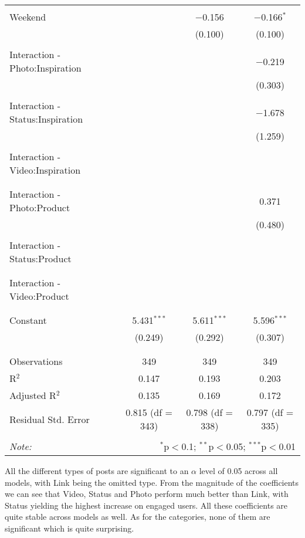 \documentclass[
]{article}
\begin{document}
\begin{longtable}{@{\extracolsep{5pt}}lccc}
  & & & \\ 
 Weekend &  & $-$0.156 & $-$0.166$^{*}$ \\ 
  &  & (0.100) & (0.100) \\ 
  & & & \\ 
 Interaction - Photo:Inspiration &  &  & $-$0.219 \\ 
  &  &  & (0.303) \\ 
  & & & \\ 
 Interaction - Status:Inspiration &  &  & $-$1.678 \\ 
  &  &  & (1.259) \\ 
  & & & \\ 
 Interaction - Video:Inspiration &  &  &  \\ 
  &  &  &  \\ 
  & & & \\ 
 Interaction - Photo:Product &  &  & 0.371 \\ 
  &  &  & (0.480) \\ 
  & & & \\ 
 Interaction - Status:Product &  &  &  \\ 
  &  &  &  \\ 
  & & & \\ 
 Interaction - Video:Product &  &  &  \\ 
  &  &  &  \\ 
  & & & \\ 
 Constant & 5.431$^{***}$ & 5.611$^{***}$ & 5.596$^{***}$ \\ 
  & (0.249) & (0.292) & (0.307) \\ 
  & & & \\ 
\hline \\[-1.8ex] 
Observations & 349 & 349 & 349 \\ 
R$^{2}$ & 0.147 & 0.193 & 0.203 \\ 
Adjusted R$^{2}$ & 0.135 & 0.169 & 0.172 \\ 
Residual Std. Error & 0.815 (df = 343) & 0.798 (df = 338) & 0.797 (df = 335) \\ 
\hline 
\hline \\[-1.8ex] 
\textit{Note:}  & \multicolumn{3}{r}{$^{*}$p$<$0.1; $^{**}$p$<$0.05; $^{***}$p$<$0.01} \\ 
\end{longtable}

All the different types of posts are significant to an \(\alpha\) level
of 0.05 across all models, with Link being the omitted type. From the
magnitude of the coefficients we can see that Video, Status and Photo
perform much better than Link, with Status yielding the highest increase
on engaged users. All these coefficients are quite stable across models
as well. As for the categories, none of them are significant which is
quite surprising.
\end{document}
